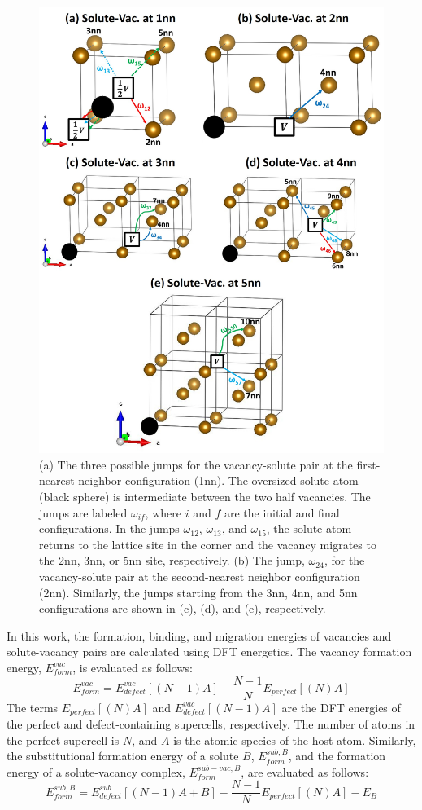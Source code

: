 \documentclass[preprint,12pt]{elsarticle}
\begin{document}
\begin{figure}
    \centering
    \includegraphics[width=0.7\linewidth]{jumps_all_modified_arrows.jpg}
    \caption{(a) The three possible jumps for the vacancy-solute pair at the first-nearest neighbor configuration (1nn). The oversized solute atom (black sphere) is intermediate between the two half vacancies. The jumps are labeled $\omega_{if}$, where $i$ and $f$ are the initial and final configurations. In the jumps $\omega_{12}$, $\omega_{13}$, and $\omega_{15}$, the solute atom returns to the lattice site in the corner and the vacancy migrates to the 2nn, 3nn, or 5nn site, respectively. (b) The jump, $\omega_{24}$, for the vacancy-solute pair at the second-nearest neighbor configuration (2nn). Similarly, the jumps starting from the 3nn, 4nn, and 5nn configurations are shown in (c), (d), and (e), respectively.}
    \label{fig:jumps}
\end{figure}


In this work, the formation, binding, and migration energies of vacancies and solute-vacancy pairs are calculated using DFT energetics. The vacancy formation energy, $E_{form}^{vac}$, is evaluated as follows:
\begin{equation}
\label{eq_Ef_vac}
   E_{form}^{vac} = E^{vac}_{defect}[(N-1)A] - \frac{N-1}{N} E_{perfect}[(N) A] 
\end{equation}
The terms $E_{perfect}[(N) A]$ and $E^{vac}_{defect}[(N-1)A]$ are the DFT energies of the perfect and defect-containing supercells, respectively. The number of atoms in the perfect supercell is $N$, and $A$ is the atomic species of the host atom. Similarly, the substitutional formation energy of a solute $B$, $E_{form}^{sub,B}$, and the formation energy of a solute-vacancy complex, $E_{form}^{sub-vac,B}$, are evaluated as follows:
\begin{equation}
\label{eq_Ef_sub}
    E_{form}^{sub,B} = E_{defect}^{sub}[(N-1)A + B] - \frac{N-1}{N}E_{perfect}[(N) A] - E_{B}
\end{equation}
\end{document}
